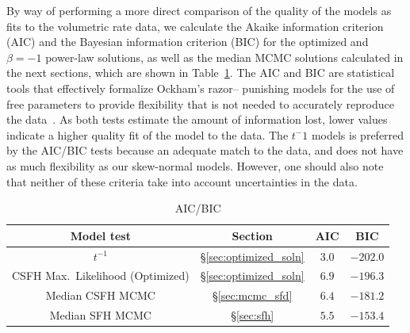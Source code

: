 \documentclass[apj, twocolumn]{aastex62}
\begin{document}
By way of performing a more direct comparison of the quality of the models as fits to the volumetric rate data, we calculate the Akaike information criterion (AIC) and the Bayesian information criterion (BIC) for the optimized and $\beta=-1$ power-law solutions, as well as the median MCMC solutions calculated in the next sections, which are shown in Table~\ref{tab:aicbic}. {The AIC and BIC are statistical tools that effectively formalize Ockham's razor-- punishing models for the use of free parameters to provide flexibility that is not needed to accurately reproduce the data~\citep{Akaike:1998fp,Schwarz:1978qd}. As both tests estimate the amount of information lost, lower values indicate a higher quality fit of the model to the data. The $t^-1$ models is preferred by the AIC/BIC tests because an adequate match to the data, and does not have as much flexibility as our skew-normal models. However, one should also note that neither of these criteria take into account uncertainties in the data.}

\begin{table}[h]
	\centering
	\caption{AIC/BIC}
	\label{tab:aicbic}
	\begin{tabular}{cccc}
		\hline
		Model test & Section & AIC & BIC\\
		\hline
		$t^{-1}$&\S\ref{sec:optimized_soln} & $3.0$ & $-202.0$\\
		CSFH Max.~Likelihood (Optimized)&\S\ref{sec:optimized_soln}& $6.9$ & $-196.3$\\
		Median CSFH MCMC&\S\ref{sec:mcmc_sfd}& $6.4$ & $-181.2$\\
		Median SFH MCMC&\S\ref{sec:sfh}& $5.5$ & $-153.4$\\
		\hline
	\end{tabular}
\end{table}
\end{document}
